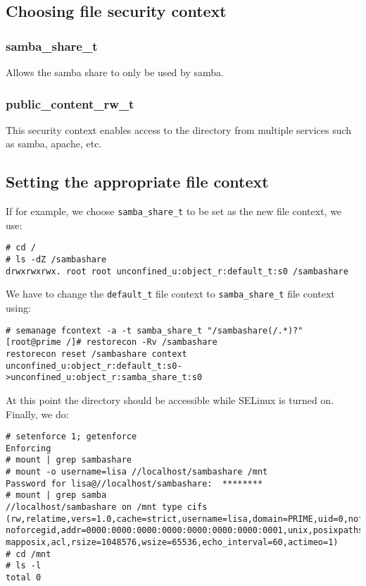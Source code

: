 \subsection{Choosing file security context}
\vspace{-15pt}
\subsubsection{samba\_share\_t}
\vspace{-10pt}
Allows the samba share to only be used by samba. 

\vspace{-15pt}
\subsubsection{public\_content\_rw\_t}
\vspace{-10pt}
This security context enables access to the directory from multiple services such as samba, apache, etc.

\subsection{Setting the appropriate file context}
If for example, we choose \verb|samba_share_t| to be set as the new file context, we use:

\vspace{-15pt}
\begin{verbatim}
# cd /
# ls -dZ /sambashare
drwxrwxrwx. root root unconfined_u:object_r:default_t:s0 /sambashare
\end{verbatim}
\vspace{-10pt}	

\noindent
We have to change the \verb|default_t| file context to \verb|samba_share_t| file context using:

\vspace{-15pt}
\begin{verbatim}
# semanage fcontext -a -t samba_share_t "/sambashare(/.*)?"
[root@prime /]# restorecon -Rv /sambashare
restorecon reset /sambashare context unconfined_u:object_r:default_t:s0->unconfined_u:object_r:samba_share_t:s0
\end{verbatim}
\vspace{-10pt}	

\noindent
At this point the directory should be accessible while SELinux is turned on. Finally, we do:

\vspace{-15pt}
\begin{verbatim}
# setenforce 1; getenforce
Enforcing
# mount | grep sambashare
# mount -o username=lisa //localhost/sambashare /mnt
Password for lisa@//localhost/sambashare:  ********
# mount | grep samba
//localhost/sambashare on /mnt type cifs (rw,relatime,vers=1.0,cache=strict,username=lisa,domain=PRIME,uid=0,noforceuid,gid=0, noforcegid,addr=0000:0000:0000:0000:0000:0000:0000:0001,unix,posixpaths,serverino, mapposix,acl,rsize=1048576,wsize=65536,echo_interval=60,actimeo=1)
# cd /mnt
# ls -l
total 0
\end{verbatim}
\vspace{-10pt}	

